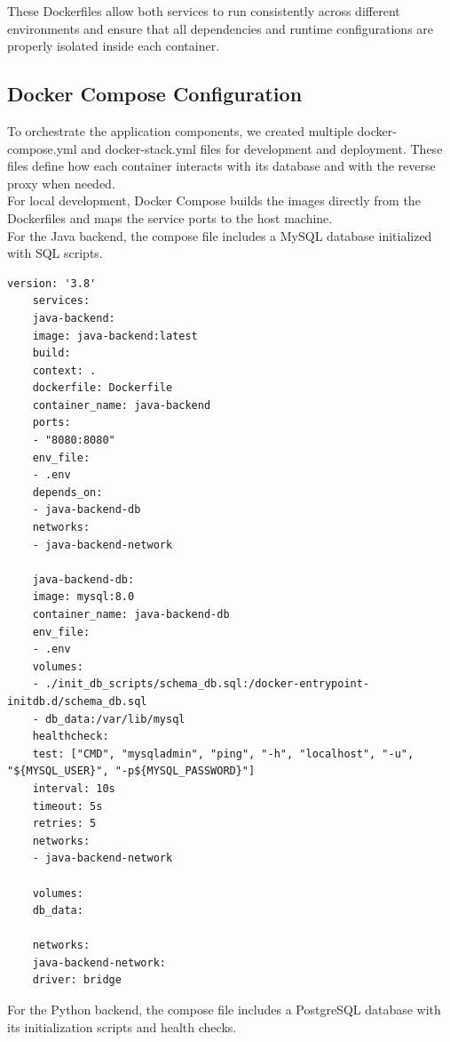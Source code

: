 \documentclass[12pt,a4paper]{article}
\begin{document}
These Dockerfiles allow both services to run consistently across different environments and ensure that all dependencies and runtime configurations are properly isolated inside each container.

\subsection{Docker Compose Configuration}
To orchestrate the application components, we created multiple docker-compose.yml and docker-stack.yml files for development and deployment. These files define how each container interacts with its database and with the reverse proxy when needed.\\ 

For local development, Docker Compose builds the images directly from the Dockerfiles and maps the service ports to the host machine.\\ 

For the Java backend, the compose file includes a MySQL database initialized with SQL scripts.\\ 

\begin{lstlisting}[style=dockerstyle,caption={docker-compose.yml for Java Backend (Local)}]
	version: '3.8'
	services:
	java-backend:
	image: java-backend:latest
	build:
	context: .
	dockerfile: Dockerfile
	container_name: java-backend
	ports:
	- "8080:8080"
	env_file:
	- .env
	depends_on:
	- java-backend-db
	networks:
	- java-backend-network
	
	java-backend-db:
	image: mysql:8.0
	container_name: java-backend-db
	env_file:
	- .env
	volumes:
	- ./init_db_scripts/schema_db.sql:/docker-entrypoint-initdb.d/schema_db.sql
	- db_data:/var/lib/mysql
	healthcheck:
	test: ["CMD", "mysqladmin", "ping", "-h", "localhost", "-u", "${MYSQL_USER}", "-p${MYSQL_PASSWORD}"]
	interval: 10s
	timeout: 5s
	retries: 5
	networks:
	- java-backend-network
	
	volumes:
	db_data:
	
	networks:
	java-backend-network:
	driver: bridge
\end{lstlisting}
\vspace{0.5cm} 

For the Python backend, the compose file includes a PostgreSQL database with its initialization scripts and health checks.\\
\end{document}
